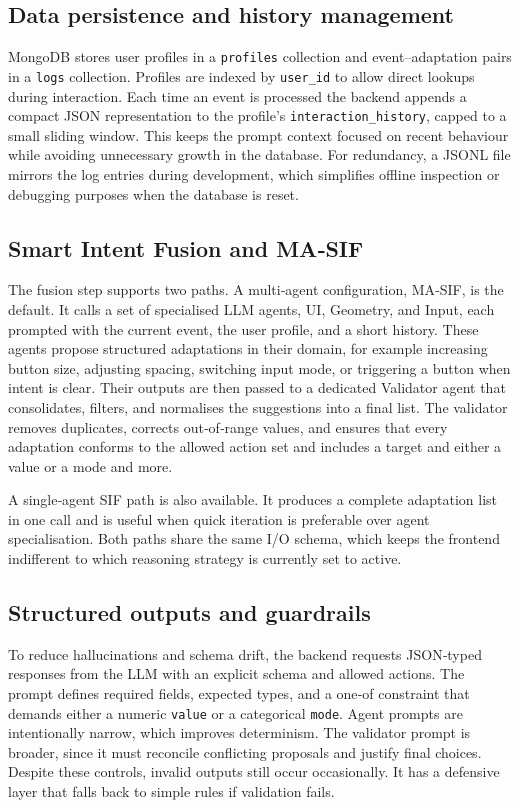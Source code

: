 \documentclass[openany]{book}
\begin{document}
\subsection{Data persistence and history management}
MongoDB stores user profiles in a \texttt{profiles} collection and event–adaptation pairs in a \texttt{logs} collection. Profiles are indexed by \texttt{user\_id} to allow direct lookups during interaction. Each time an event is processed the backend appends a compact JSON representation to the profile’s \texttt{interaction\_history}, capped to a small sliding window. This keeps the prompt context focused on recent behaviour while avoiding unnecessary growth in the database. For redundancy, a JSONL file mirrors the log entries during development, which simplifies offline inspection or debugging purposes when the database is reset.

\subsection{Smart Intent Fusion and MA‑SIF}
The fusion step supports two paths. A multi‑agent configuration, MA‑SIF, is the default. It calls a set of specialised LLM agents, UI, Geometry, and Input, each prompted with the current event, the user profile, and a short history. These agents propose structured adaptations in their domain, for example increasing button size, adjusting spacing, switching input mode, or triggering a button when intent is clear. Their outputs are then passed to a dedicated Validator agent that consolidates, filters, and normalises the suggestions into a final list. The validator removes duplicates, corrects out‑of‑range values, and ensures that every adaptation conforms to the allowed action set and includes a target and either a value or a mode and more.

A single‑agent SIF path is also available. It produces a complete adaptation list in one call and is useful when quick iteration is preferable over agent specialisation. Both paths share the same I/O schema, which keeps the frontend indifferent to which reasoning strategy is currently set to active.

\subsection{Structured outputs and guardrails}
To reduce hallucinations and schema drift, the backend requests JSON‑typed responses from the LLM with an explicit schema and allowed actions. The prompt defines required fields, expected types, and a one‑of constraint that demands either a numeric \texttt{value} or a categorical \texttt{mode}. Agent prompts are intentionally narrow, which improves determinism. The validator prompt is broader, since it must reconcile conflicting proposals and justify final choices. Despite these controls, invalid outputs still occur occasionally.
It has a defensive layer that falls back to simple rules if validation fails.
\end{document}
